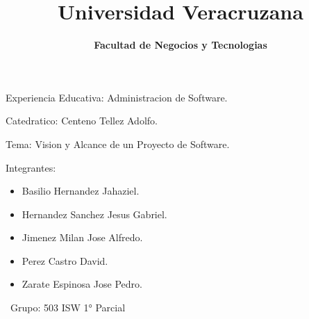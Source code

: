 \documentclass[40pt]{article}
\title{\textbf{Universidad Veracruzana} }
\date{\textbf{Facultad de Negocios y Tecnologias} }
\begin{document}
\maketitle
\textsf{\Large Experiencia Educativa: Administracion de Software. \\}
 
\maketitle
\textsf{\Large Catedratico: Centeno Tellez Adolfo. \\}

\maketitle
\textsf{\Large Tema: Vision y Alcance de un Proyecto de Software. \\}

\maketitle
\textsf{\Large Integrantes: \\}
\begin{itemize}
    \item Basilio Hernandez Jahaziel.
    \item Hernandez Sanchez Jesus Gabriel.
    \item Jimenez Milan Jose Alfredo.
    \item Perez Castro David.
    \item Zarate Espinosa Jose Pedro.   
\end{itemize}

\maketitle
\textsf{\ Grupo: 503 ISW 1° Parcial \\}
\end{document}
